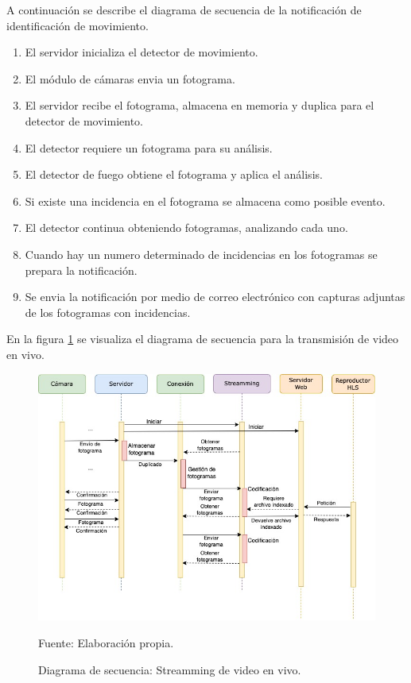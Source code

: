A continuación se describe el diagrama de secuencia de la notificación de identificación de movimiento.\\
\begin{enumerate}
    \item El servidor inicializa el detector de movimiento.
    \item El módulo de cámaras envia un fotograma.    
    \item El servidor recibe el fotograma, almacena en memoria y duplica para el detector de movimiento.
    \item El detector requiere un fotograma para su análisis.
    \item El detector de fuego obtiene el fotograma y aplica el análisis.
    \item Si existe una incidencia en el fotograma se almacena como posible evento. 
    \item El detector continua obteniendo fotogramas, analizando cada uno.
    \item Cuando hay un numero determinado de incidencias en los fotogramas se prepara la notificación.
    \item Se envia la notificación por medio de correo electrónico con capturas adjuntas de los fotogramas con incidencias.
\end{enumerate}

En la figura \ref{fig:diag_sec_streamming} se visualiza el diagrama de secuencia para la transmisión de video en vivo.

\begin{figure}[H]
    \begin{center}
        \includegraphics[width=16cm]{img/capitulo_4/stream_secuense.jpg}
    \end{center}
    \begin{center}
        \caption{Diagrama de secuencia: Streamming de video en vivo.}
        Fuente: Elaboración propia.
        \label{fig:diag_sec_streamming}
    \end{center}
\end{figure}


